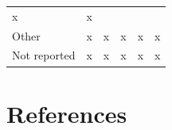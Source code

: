 \documentclass[]{article}
\begin{document}
\begin{longtable}[]{@{}llllll@{}}
\begin{minipage}[t]{0.10\columnwidth}
x\strut
\end{minipage} & \begin{minipage}[t]{0.15\columnwidth}\raggedright
x\strut
\end{minipage}\tabularnewline
\begin{minipage}[t]{0.16\columnwidth}\raggedright
Other\strut
\end{minipage} & \begin{minipage}[t]{0.10\columnwidth}\raggedright
x\strut
\end{minipage} & \begin{minipage}[t]{0.17\columnwidth}\raggedright
x\strut
\end{minipage} & \begin{minipage}[t]{0.16\columnwidth}\raggedright
x\strut
\end{minipage} & \begin{minipage}[t]{0.10\columnwidth}\raggedright
x\strut
\end{minipage} & \begin{minipage}[t]{0.15\columnwidth}\raggedright
x\strut
\end{minipage}\tabularnewline
\begin{minipage}[t]{0.16\columnwidth}\raggedright
Not reported\strut
\end{minipage} & \begin{minipage}[t]{0.10\columnwidth}\raggedright
x\strut
\end{minipage} & \begin{minipage}[t]{0.17\columnwidth}\raggedright
x\strut
\end{minipage} & \begin{minipage}[t]{0.16\columnwidth}\raggedright
x\strut
\end{minipage} & \begin{minipage}[t]{0.10\columnwidth}\raggedright
x\strut
\end{minipage} & \begin{minipage}[t]{0.15\columnwidth}\raggedright
x\strut
\end{minipage}\tabularnewline
\bottomrule
\end{longtable}

\newpage

\hypertarget{references}{%
\section*{References}\label{references}}
\end{document}
